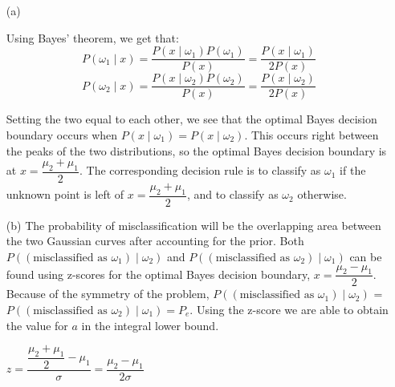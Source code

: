\documentclass[11pt]{exam}
\theoremstyle{quest}
\begin{document}
\begin{itemize}
\item[(a)]

Using Bayes' theorem, we get that:
\begin{equation*}P(\omega_{1} \mid x) = \frac{P(x \mid \omega_{1})P(\omega_{1})}{P(x)} = \frac{P(x \mid \omega_{1})}{2P(x)}
\end{equation*}
\begin{equation*}P(\omega_{2} \mid x) = \frac{P(x \mid \omega_{2})P(\omega_{2})}{P(x)} = \frac{P(x \mid \omega_{2})}{2P(x)}
\end{equation*}

Setting the two equal to each other, we see that the optimal Bayes decision boundary occurs when $P(x \mid \omega_{1}) = P(x \mid \omega_{2})$. This occurs right between the peaks of the two distributions, so the optimal Bayes decision boundary is at $x=\dfrac{\mu_2 + \mu_1}{2}$.  The corresponding decision rule is to classify as $\omega_1$ if the unknown point is left of $x=\dfrac{\mu_2 + \mu_1}{2}$, and to classify as $\omega_2$ otherwise.

\item[(b)] The probability of misclassification will be the overlapping area between the two Gaussian curves after accounting for the prior. Both $P((\text{misclassified as }\omega_{1}) \mid \omega_{2})$ and $P((\text{misclassified as }\omega_{2}) \mid \omega_{1})$ can be found using z-scores for the optimal Bayes decision boundary, $x = \dfrac{\mu_2 - \mu_1}{2}$.  Because of the symmetry of the problem, $P((\text{misclassified as }\omega_{1}) \mid \omega_{2})$ = $P((\text{misclassified as }\omega_{2}) \mid \omega_{1}) = P_e$.  Using the z-score we are able to obtain the value for $a$ in the integral lower bound.

$z = \dfrac{\dfrac{\mu_2 + \mu_1}{2} - \mu_1}{\sigma} = \dfrac{\mu_2 - \mu_1}{2\sigma}$

\end{itemize}
\end{document}
